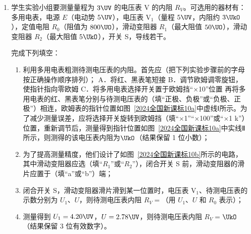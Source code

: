 \documentclass[\gkver]{gaokaozhenti}
\begin{document}
\begin{enumerate}
{$m_{a}v_{0} = m_{a}v_{a} + m_{b}v_{b}$

整理得 $m_{a}x_{P} = m_{a}x_{M} + m_{b}x_{N}$

小球离开斜槽末端后做平抛运动，竖直方向高度相同故下落时间相同，水平方向做匀速直线运动，小球水平飞出时的速度与平抛运动的水平位移成正比。
}

\item
学生实验小组要测量量程为 $3 \UV$ 的电压表 V 的内阻 $R_{V}$。可选用的器材有：多用电表，电源 $E$（电动势 $5 \UV$），电压表 V$_{1}$（量程 $5 \UV$，内阻约 $3 \UkO$），定值电阻 $R_{0}$（阻值为 $800 \UO$），滑动变阻器 $R_{1}$（最大阻值 $50 \UO$），滑动变阻器 $R_{2}$（最大阻值 $5 \UkO$），开关 S，导线若干。

完成下列填空：
\begin{enumerate}
	\item
	利用多用电表粗测待测电压表的内阻。首先应\tkanswer[1.5cm]{}（把下列实验步骤前的字母按正确操作顺序排列）；
	A．将红、黑表笔短接
	B．调节欧姆调零旋钮，使指针指向零欧姆
	C．将多用电表选择开关置于欧姆挡“$\times$10”位置
	再将多用电表的红、黑表笔分别与待测电压表的\tkanswer[1.5cm]{}（填“正极、负极”或“负极、正极”）相连，欧姆表的指针位置如图~\ref{2024全国新课标10a}中虚线Ⅰ所示。为了减少测量误差，应将选择开关旋转到欧姆挡\tkanswer[1.5cm]{}（填“$\times$1”“$\times$100”或“$\times$1 k”）位置，重新调节后，测量得到指针位置如图~\ref{2024全国新课标10a}中实线Ⅱ所示，则测得的该电压表内阻为\tkanswer[1.5cm]{}$\UkO$（结果保留 1 位小数）；
	\item
	为了提高测量精度，他们设计了如图~\ref{2024全国新课标10b}所示的电路，其中滑动变阻器应选\tkanswer[1.5cm]{}（填“$R_{1}$”或“$R_{2}$”），闭合开关 S 前，滑动变阻器的滑片应置于\tkanswer[1.5cm]{}（填“a”或“b”）端；
	\item
	闭合开关 S，滑动变阻器滑片滑到某一位置时，电压表 V$_{1}$、待测电压表的示数分别为 $U_{1}$、$U$，则待测电压表内阻 $R_{V} = $\tkanswer[1.5cm]{}（用 $U_{1}$、$U$ 和 $R_{0}$ 表示）；
	\item
	测量得到 $U_{1} = 4.20 \UV$，$U = 2.78 \UV$，则待测电压表内阻 $R_{V} = $\tkanswer[1.5cm]{}$\UkO$（结果保留 3 位有效数字）。
\end{enumerate}
\end{enumerate}
\end{document}
